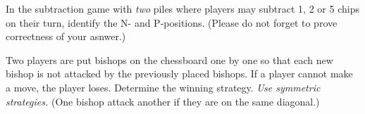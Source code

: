 \documentclass[addpoints]{exam}
\begin{document}
  \pagestyle{headandfoot}
  \runningheadrule

  \firstpagefooter{}{}{}
  \runningfooter{}{}{}
  \begin{flushright}

    \vspace{0.2in}
  \end{flushright}

  \begin{questions}
    \question[10]
      In the subtraction game with \emph{two} piles where players may subtract 1, 2 or
			5 chips on their turn, identify the N- and P-positions.
			(Please do not forget to prove correctness of your asnwer.)

      \begin{solution}[\stretch{1}]
      \end{solution}
      \newpage
    \question
      Two players are put bishops on the chessboard one by one so that each new bishop
			is not attacked by the previously placed bishops. If a player cannot make a
			move, the player loses. Determine the winning strategy. \textit{Use symmetric strategies.}
			(One bishop attack another if they are on the same diagonal.)

      \begin{solution}[\stretch{1}]
      \end{solution}
      \newpage
  \end{questions}
\end{document}
